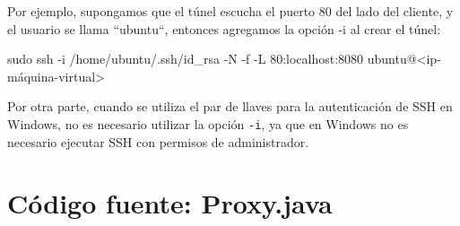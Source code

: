 \documentclass[11pt,a4paper,oneside]{book}
\begin{document}
Por ejemplo, supongamos que el túnel escucha el puerto 80 del lado del cliente, y el usuario se llama ``ubuntu``, entonces agregamos la opción -i al crear el túnel:

\begin{SourceCode}
sudo ssh -i /home/ubuntu/.ssh/id_rsa -N -f -L 80:localhost:8080 ubuntu@<ip-máquina-virtual>
\end{SourceCode}

Por otra parte, cuando se utiliza el par de llaves para la autenticación de SSH en Windows, no es necesario utilizar la opción \texttt{-i}, ya que en Windows no es necesario ejecutar SSH con permisos de administrador.

\chapter{Código fuente: Proxy.java}
\end{document}
